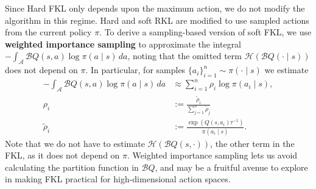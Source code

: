 \documentclass[twoside,11pt]{article}
\newcommand{\actionspace}{\mathcal{A}}
\newcommand{\boltzmannQ}{\mathcal{B}Q}
\newcommand{\entropy}{\mathcal{H}}
\begin{document}
Since Hard FKL only depends upon the maximum action, we do not modify the algorithm in this regime. Hard and soft RKL are modified to use sampled actions from the current policy $\pi$. To derive a sampling-based version of soft FKL, we use \textbf{weighted importance sampling} to approximate the integral $-\int_\actionspace \boltzmannQ(s, a) \log \pi(a \mid s)\, da$, noting that the omitted term $\entropy(\boltzmannQ(\cdot \mid s))$ does not depend on $\pi$. In particular, for samples $\{a_i\}_{i = 1}^n \sim \pi(\cdot \mid s)$ we estimate 
\begin{align*}
    -\int_\actionspace \boltzmannQ(s, a) \log \pi(a \mid s)\, da &\approx \sum_{i = 1}^n \rho_i \log \pi(a_i \mid s) ,\\
    \rho_i &:= \frac{\tilde{\rho}_i}{\sum_{j = 1}^n \tilde{\rho}_j}\\
    \tilde{\rho}_i &:= \frac{\exp(Q(s, a_i) \tau^{-1})}{\pi(a_i \mid s)}. 
\end{align*}
Note that we do not have to estimate $\entropy(\boltzmannQ(s, \cdot))$, the other term in the FKL, as it does not depend on $\pi$. Weighted importance sampling lets us avoid calculating the partition function in $\boltzmannQ$, and may be a fruitful avenue to explore in making FKL practical for high-dimensional action spaces. 
\end{document}
